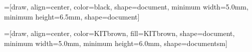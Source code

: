 \makeatletter
{}
\makeatother

=[draw, align=center, color=black, shape=document, 
  minimum width=5.0mm, minimum height=6.5mm, shape=document]

=[draw, align=center, color=KITbrown, fill=KITbrown,
  shape=document, minimum width=5.0mm, minimum height=6.0mm, shape=documentsm]





    
    




    
    


